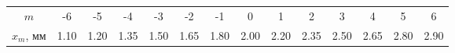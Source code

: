 \begin{tabular}{cccccccccccccc}
\toprule
$m$ & -6 & -5 & -4 & -3 & -2 & -1 & 0 & 1 & 2 & 3   & 4    & 5   & 6   \\
$x_m$, мм & 1.10 & 1.20 & 1.35 & 1.50 & 1.65 & 1.80 & 2.00 & 2.20 & 2.35 & 2.50 & 2.65 & 2.80 & 2.90 \\
\bottomrule
\end{tabular}